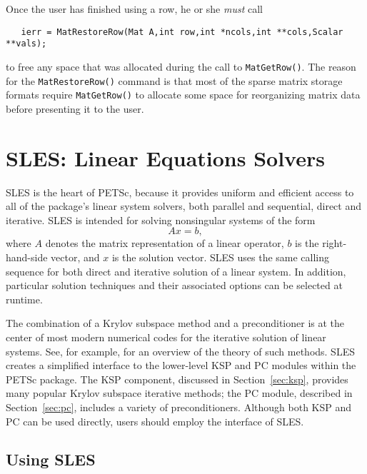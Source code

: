 Once the user has finished using a row, he or she {\em must} call 
\begin{verbatim}
   ierr = MatRestoreRow(Mat A,int row,int *ncols,int **cols,Scalar **vals);
\end{verbatim}
to free any space that was allocated during the call to {\tt MatGetRow()}.
The reason for the {\tt MatRestoreRow()} command is that most of the
sparse matrix storage formats require {\tt MatGetRow()} to allocate
some space for reorganizing matrix data before presenting it to the user.
 

\chapter{SLES: Linear Equations Solvers} 
\label{ch:sles}

SLES is the heart of PETSc, because it provides uniform and efficient access 
to all of the package's linear system solvers, both parallel and sequential,
direct and iterative.
SLES is intended for solving nonsingular systems of the form
\begin{equation}
   A x = b,
\label{eq:Ax=b}
\end{equation}
where $ A$ denotes the matrix representation of a linear operator, $b$
is the right-hand-side vector, and $ x $ is the solution vector.  SLES
uses the same calling sequence for both direct and iterative solution
of a linear system.  In addition, particular solution techniques and
their associated options can be selected at runtime.

The combination of a Krylov subspace method and a preconditioner is at
the center of most modern numerical codes for the iterative solution of
linear systems.  See, for example, \cite{fgn} for an overview of the theory
of such methods.  SLES creates a simplified interface to the
lower-level KSP and PC modules within the PETSc package.  The KSP component, 
discussed in
Section~\ref{sec:ksp}, provides many popular Krylov
 subspace iterative methods;
the PC module, described in Section~\ref{sec:pc}, includes a
variety of preconditioners.  Although both  KSP and PC can be used
directly, users should employ the interface of SLES.

\section{Using SLES} 
\label{sec:usingsles}

